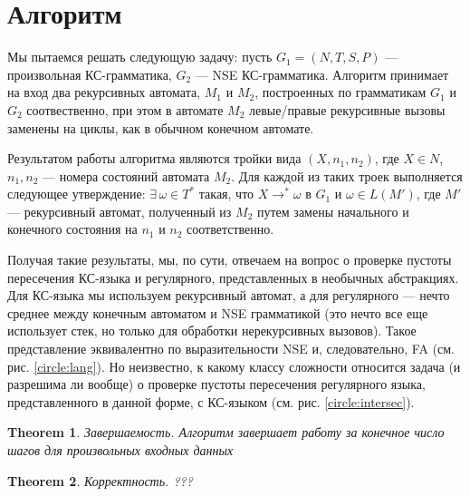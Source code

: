 \documentclass[14pt]{matmex-diploma-custom}
\newtheorem{theorem}{Theorem}
\begin{document}
	\section{Алгоритм}
	
	Мы пытаемся решать следующую задачу: пусть $G_1 = (N, T, S, P)$ --- произвольная КС-грамматика, $G_2$ --- NSE КС-грамматика. Алгоритм принимает на вход два рекурсивных автомата, $M_1$ и $M_2$, построенных по грамматикам $G_1$ и $G_2$ соотвественно, при этом в автомате $M_2$ левые/правые рекурсивные вызовы заменены на циклы, как в обычном конечном автомате.
	
	Результатом работы алгоритма являются тройки вида $(X, n_1, n_2)$, где $X \in N$, $n_1, n_2$ --- номера состояний автомата $M_2$. 
	Для каждой из таких троек выполняется следующее утверждение: $\exists \, \omega \in T^*$ такая, что $X \rightarrow^* \omega$ в $G_1$ и $\omega \in L(M')$, где $M'$ --- рекурсивный автомат, полученный из $M_2$ путем замены начального и конечного состояния на $n_1$ и $n_2$ соответственно.
	
	Получая такие результаты, мы, по сути, отвечаем на вопрос о проверке пустоты пересечения КС-языка и регулярного, представленных в необычных абстракциях. 
	Для КС-языка мы используем рекурсивный автомат, а для регулярного --- нечто среднее между конечным автоматом и NSE грамматикой (это нечто все еще использует стек, но только для обработки нерекурсивных вызовов). 
	Такое представление эквивалентно по выразительности NSE и, следовательно, FA (см. рис. \ref{circle:lang}). 
	Но неизвестно, к какому классу сложности относится задача (и разрешима ли вообще) о проверке пустоты пересечения регулярного языка, представленного в данной форме, с КС-языком (см. рис. \ref{circle:intersec}).
	
	\begin{theorem}{Завершаемость.}
		Алгоритм завершает работу за конечное число шагов для произвольных входных данных
	\end{theorem}
	
	\begin{theorem}{Корректность.}
		???
	\end{theorem}
\end{document}
